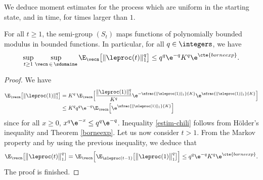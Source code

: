 We deduce moment estimates for the process which are uniform in the starting state, and in time, for times larger than $1$.
\begin{corollary}\label{auxbornees}
For all $t\ge1$, the semi-group $(S_{t})$ maps functions of polynomially bounded modulus in bounded
functions.
In particular, for all $q\in\integers$, we have
\begin{equation}
\label{estim-chili}
\sup_{t\geq 1}\sup_{\vecn\,\in\, \sdomaine} \E_{\vecn} \bigl[\|\leproc(t)\|_1^{q}\bigr]
\leq q^q \e^{-q} K^q \e^{\cte{borneexp}}.
\end{equation}
\end{corollary}
\begin{proof}
We have
\begin{align*}
\E_{\vecn} \bigl[\|\leproc(1)\|_1^{q}\bigr]
& = K^q\, \E_{\vecn}\Bigl[\frac{\|\leproc(1)\|_1^{q}}{K^q} \e^{-\sfrac{\|\sleproc(1)\|_{1}}{K}} \e^{\sfrac{\|\sleproc(1)\|_{1}}{K}}\Bigr]\\
& \leq K^q q^q \e^{-q} \E_{\vecn} \Bigl[\e^{\sfrac{\|\sleproc(1)\|_{1}}{K}}\Bigr]
\end{align*}
since for all $x\geq 0$, $x^q \e^{-x}\leq q^q \e^{-q}$.
Inequality \eqref{estim-chili} follows from Hölder's inequality and Theorem \ref{borneexp}.
Let us now consider $t> 1$. From the Markov property and by using the previous inequality, we deduce that
\[
\E_{\vecn}\bigl[\big\|\leproc(t)\big\|_1^{q}\bigr]
= \E_{\vecn}\Bigl[\E_{\sleproc(t-1)}\bigl[\big\|\leproc(1)\big\|^{q}_1\bigr]\Bigr]
\le q^q \e^{-q} K^q \e^{\cte{borneexp}}.
\]
The proof is finished.
\end{proof}

